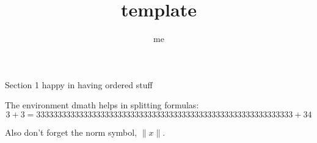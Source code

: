 \documentclass[9pt]{article}
\title {template}
\author {me}
\newcommand\norm[1]{\lVert#1\rVert}
\theoremstyle{definition}
\theoremstyle{remark}
\begin{document}
\maketitle
\begin{section}{Section 1}
happy in having ordered stuff


The environment dmath helps in splitting formulas:
\begin{dmath}
3 + 3 = 333333333333333333333333333333333333333333333333333333333333 + 34
\end{dmath}

Also don't forget the norm symbol, $\norm{x}$.
\end{section}
\end{document}

